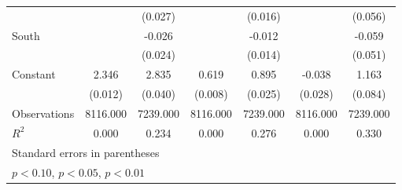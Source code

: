 {\begin{tabular}{l*{6}{c}}
                    &                     &     (0.027)         &                     &     (0.016)         &                     &     (0.056)         \\
\addlinespace
South               &                     &      -0.026         &                     &      -0.012         &                     &      -0.059         \\
                    &                     &     (0.024)         &                     &     (0.014)         &                     &     (0.051)         \\
\addlinespace
Constant            &       2.346\sym{***}&       2.835\sym{***}&       0.619\sym{***}&       0.895\sym{***}&      -0.038         &       1.163\sym{***}\\
                    &     (0.012)         &     (0.040)         &     (0.008)         &     (0.025)         &     (0.028)         &     (0.084)         \\
\midrule
Observations        &    8116.000         &    7239.000         &    8116.000         &    7239.000         &    8116.000         &    7239.000         \\
\(R^{2}\)           &       0.000         &       0.234         &       0.000         &       0.276         &       0.000         &       0.330         \\
\bottomrule
\multicolumn{7}{l}{\footnotesize Standard errors in parentheses}\\
\multicolumn{7}{l}{\footnotesize \sym{*} \(p<0.10\), \sym{**} \(p<0.05\), \sym{***} \(p<0.01\)}\\
\end{tabular}
}
